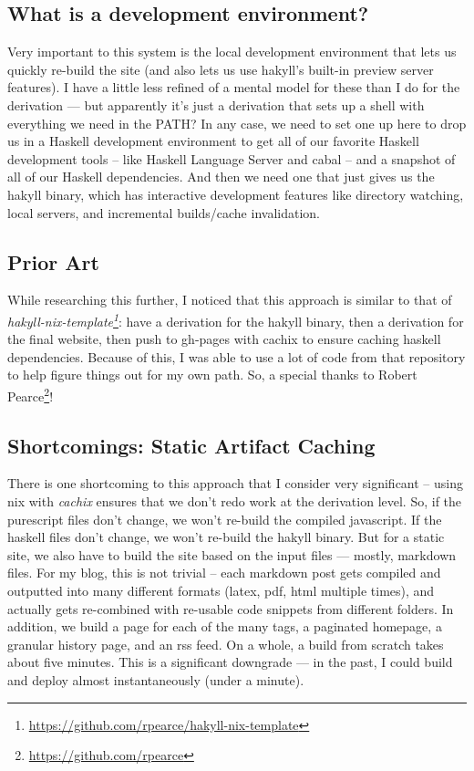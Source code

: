 \documentclass[]{article}
\renewcommand{\href}[2]{#2\footnote{\url{#1}}}
\begin{document}
\subsection{What is a development
environment?}\label{what-is-a-development-environment}

Very important to this system is the local development environment that lets us
quickly re-build the site (and also lets us use hakyll's built-in preview server
features). I have a little less refined of a mental model for these than I do
for the derivation --- but apparently it's just a derivation that sets up a
shell with everything we need in the PATH? In any case, we need to set one up
here to drop us in a Haskell development environment to get all of our favorite
Haskell development tools -- like Haskell Language Server and cabal -- and a
snapshot of all of our Haskell dependencies. And then we need one that just
gives us the hakyll binary, which has interactive development features like
directory watching, local servers, and incremental builds/cache invalidation.

\subsection{Prior Art}\label{prior-art}

While researching this further, I noticed that this approach is similar to that
of
\emph{\href{https://github.com/rpearce/hakyll-nix-template}{hakyll-nix-template}}:
have a derivation for the hakyll binary, then a derivation for the final
website, then push to gh-pages with cachix to ensure caching haskell
dependencies. Because of this, I was able to use a lot of code from that
repository to help figure things out for my own path. So, a special thanks to
\href{https://github.com/rpearce}{Robert Pearce}!

\subsection{Shortcomings: Static Artifact
Caching}\label{shortcomings-static-artifact-caching}

There is one shortcoming to this approach that I consider very significant --
using nix with \emph{cachix} ensures that we don't redo work at the derivation
level. So, if the purescript files don't change, we won't re-build the compiled
javascript. If the haskell files don't change, we won't re-build the hakyll
binary. But for a static site, we also have to build the site based on the input
files --- mostly, markdown files. For my blog, this is not trivial -- each
markdown post gets compiled and outputted into many different formats (latex,
pdf, html multiple times), and actually gets re-combined with re-usable code
snippets from different folders. In addition, we build a page for each of the
many tags, a paginated homepage, a granular history page, and an rss feed. On a
whole, a build from scratch takes about five minutes. This is a significant
downgrade --- in the past, I could build and deploy almost instantaneously
(under a minute).
\end{document}
